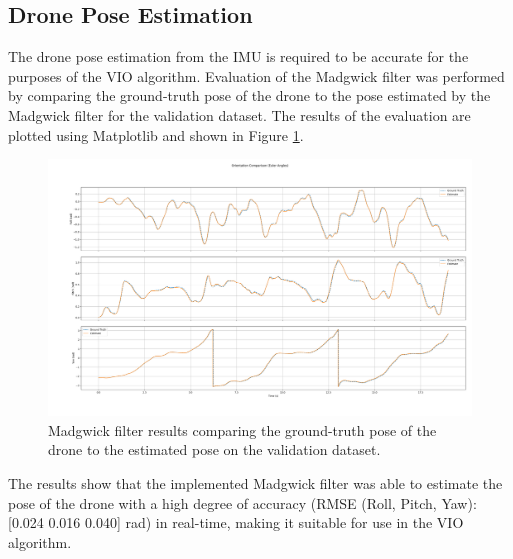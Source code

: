 \documentclass[bare_jrnl_transmag]{subfiles}
\begin{document}
\subsection{Drone Pose Estimation}
The drone pose estimation from the IMU is required to be accurate for the purposes of the VIO algorithm. Evaluation of the Madgwick filter was performed by comparing the ground-truth pose of the drone to the pose estimated by the Madgwick filter for the validation dataset. The results of the evaluation are plotted using Matplotlib \cite{matplotlib} and shown in Figure \ref{fig:madgwick_results}.

\begin{figure}[H]
    \centering
    \includegraphics[width=0.8\linewidth]{figures/madgwick_results.png}
    \caption{Madgwick filter results comparing the ground-truth pose of the drone to the estimated pose on the validation dataset.}
    \label{fig:madgwick_results}
\end{figure}

The results show that the implemented Madgwick filter was able to estimate the pose of the drone with a high degree of accuracy (RMSE (Roll, Pitch, Yaw): [0.024 0.016 0.040] rad) in real-time, making it suitable for use in the VIO algorithm.
\end{document}

